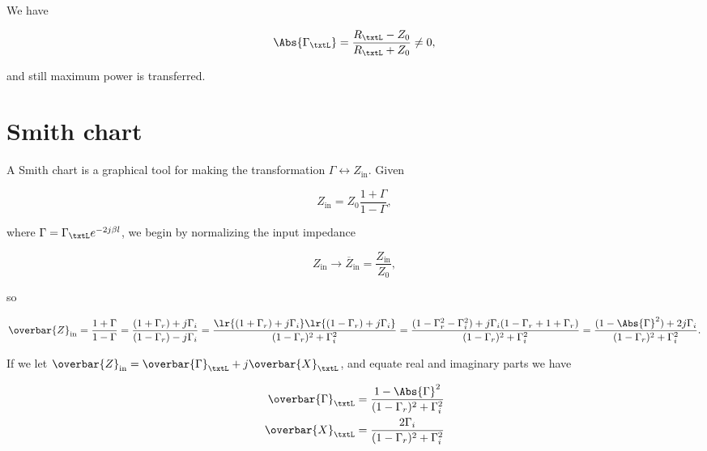We have

\begin{equation}\label{eqn:uwavesDeck5SmithChartCore:340}
\Abs{\Gamma_\txtL} = \frac{ R_\txtL - Z_0 }{R_\txtL + Z_0} \ne 0,
\end{equation}

and still maximum power is transferred.

\section{Smith chart}

A Smith chart is a graphical tool for making the transformation \( \Gamma \leftrightarrow Z_{\textrm{in}} \).  Given

\begin{equation}\label{eqn:uwavesDeck5SmithChartCore:360}
Z_{\textrm{in}} = Z_0 \frac{ 1 + \Gamma }{ 1 - \Gamma },
\end{equation}

where \( \Gamma = \Gamma_\txtL e^{- 2 j \beta l } \), we begin by normalizing the input impedance

\begin{equation}\label{eqn:uwavesDeck5SmithChartCore:380}
Z_{\textrm{in}} \rightarrow \overbar{Z}_{\textrm{in}} = \frac{Z_{\textrm{in}}}{Z_0}, 
\end{equation}

so

\begin{dmath}\label{eqn:uwavesDeck5SmithChartCore:400}
\overbar{Z}_{\textrm{in}} 
= \frac{ 1 + \Gamma }{ 1 - \Gamma }
= \frac{ (1 + \Gamma_r) + j \Gamma_i }{ (1 - \Gamma_r) - j \Gamma_i }
= \frac{ \lr{ (1 + \Gamma_r) + j \Gamma_i}\lr{(1 - \Gamma_r) + j \Gamma_i} }{ (1 - \Gamma_r)^2 + \Gamma_i^2 }
= \frac{ (1 - \Gamma_r^2 - \Gamma_i^2) + j \Gamma_i (1 - \Gamma_r + 1 + \Gamma_r ) }{ (1 - \Gamma_r)^2 + \Gamma_i^2 }
= \frac{ (1 - \Abs{\Gamma}^2) + 2 j \Gamma_i }{ (1 - \Gamma_r)^2 + \Gamma_i^2 }.
\end{dmath}

If we let \( \overbar{Z}_{\textrm{in}} = \overbar{\Gamma}_\txtL + j \overbar{X}_\txtL \), and equate real and imaginary parts we have

\begin{equation}\label{eqn:uwavesDeck5SmithChartCore:420}
\begin{aligned}
\overbar{\Gamma}_\txtL &= \frac{ 1 - \Abs{\Gamma}^2 }{ (1 - \Gamma_r)^2 + \Gamma_i^2 } \\
\overbar{X}_\txtL &= \frac{2 \Gamma_i }{ (1 - \Gamma_r)^2 + \Gamma_i^2 }
\end{aligned}
\end{equation}

